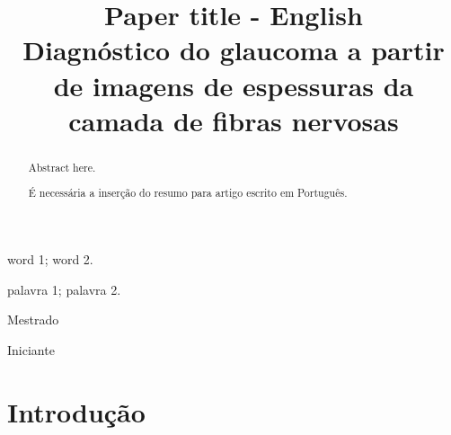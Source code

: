 \documentclass[conference]{IEEEtran}
\begin{document}
\title{Paper title - English \\ Diagnóstico do glaucoma a partir de imagens de espessuras da camada de fibras nervosas}


\author{
}


\maketitle

\thispagestyle{fancy}

\renewcommand{\abstractname}{Abstract}
\begin{abstract}
Abstract here.
\end{abstract}

\renewcommand\IEEEkeywordsname{Keywords}
\begin{IEEEkeywords}
\label{Keywords}
word 1; word 2.
\end{IEEEkeywords}

\renewcommand{\abstractname}{Resumo}
\begin{abstract}
\label{Resumo}
\'E necess\'aria a inser\c{c}\~{a}o do resumo para artigo escrito em Portugu\^{e}s.
\end{abstract}

\renewcommand\IEEEkeywordsname{Palavras-chave}
\begin{IEEEkeywords}
\label{Palavras-chave}
palavra 1; palavra 2.
\end{IEEEkeywords}

\renewcommand\IEEEkeywordsname{Classifica\c{c}\~{a}o}
\begin{IEEEkeywords}
	\label{classificacao}
	Mestrado
\end{IEEEkeywords}

\renewcommand\IEEEkeywordsname{Categoria}
\begin{IEEEkeywords}
	\label{Categoria}
	Iniciante 
\end{IEEEkeywords}

\IEEEpeerreviewmaketitle


\section{Introdução}

\end{document}
